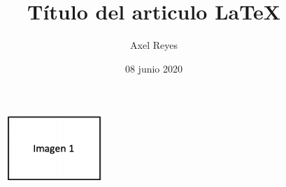 \documentclass[letterpaper]{article} %
\title{Título del articulo \LaTeX} %
\author{Axel Reyes} %
\date{08 junio 2020} %
\begin{document}
    \begin{figure}[!t] %
        \begin{center} 
        \centering  
            \includegraphics[scale=0.90]{imagenes/imagen1.png}
        \end{center}
    \end{figure}
    
    \maketitle %
    
      
    \renewcommand{\tablename}{Tabla} %

    
    

    
    
\end{document}
